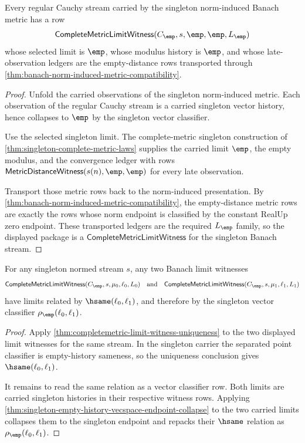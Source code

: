 \begin{theorem}
\label{thm:banach-regular-cauchy-limit-witness}
Every regular Cauchy stream carried by the singleton norm-induced Banach
metric has a row
$$
\mathsf{CompleteMetricLimitWitness}(C_{\emp},s,\emp,\emp,L_{\emp})
$$
whose selected limit is $\emp$, whose modulus history is $\emp$, and whose
late-observation ledgers are the empty-distance rows transported through
\autoref{thm:banach-norm-induced-metric-compatibility}.
\end{theorem}
\begin{proof}
Unfold the carried observations of the singleton norm-induced metric. Each
observation of the regular Cauchy stream is a carried singleton vector
history, hence collapses to $\emp$ by the singleton vector classifier.

Use the selected singleton limit. The complete-metric singleton construction
of \autoref{thm:singleton-complete-metric-laws} supplies the carried limit
$\emp$, the empty modulus, and the convergence ledger with rows
$\mathsf{MetricDistanceWitness}(s(n),\emp,\emp)$ for every late observation.

Transport those metric rows back to the norm-induced presentation. By
\autoref{thm:banach-norm-induced-metric-compatibility}, the empty-distance
metric rows are exactly the rows whose norm endpoint is classified by the
constant RealUp zero endpoint. These transported ledgers are the required
$L_{\emp}$ family, so the displayed package is a
$\mathsf{CompleteMetricLimitWitness}$ for the singleton Banach stream.
\end{proof}

\begin{theorem}
\label{thm:banach-limit-classifier-uniqueness}
For any singleton normed stream $s$, any two Banach limit witnesses
$$
\mathsf{CompleteMetricLimitWitness}(C_{\emp},s,\mu_0,\ell_0,L_0)
\quad\text{and}\quad
\mathsf{CompleteMetricLimitWitness}(C_{\emp},s,\mu_1,\ell_1,L_1)
$$
have limits related by $\hsame(\ell_0,\ell_1)$, and therefore by the
singleton vector classifier $\rho_{\emp}(\ell_0,\ell_1)$.
\end{theorem}
\begin{proof}
Apply \autoref{thm:completemetric-limit-witness-uniqueness} to the two
displayed limit witnesses for the same stream. In the singleton carrier the
separated point classifier is empty-history sameness, so the uniqueness
conclusion gives $\hsame(\ell_0,\ell_1)$.

It remains to read the same relation as a vector classifier row. Both limits
are carried singleton histories in their respective witness rows. Applying
\autoref{thm:singleton-empty-history-vecspace-endpoint-collapse} to the two
carried limits collapses them to the singleton endpoint and repacks their
$\hsame$ relation as $\rho_{\emp}(\ell_0,\ell_1)$.
\end{proof}

